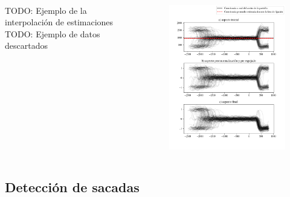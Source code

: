\documentclass[aspectratio=169]{beamer}
\begin{document}
\begin{frame}{~}

  \begin{columns}
    \begin{column}{0.5\textwidth}
      TODO: Ejemplo de la interpolación de estimaciones
      TODO: Ejemplo de datos descartados
    \end{column}
    \begin{column}{0.5\textwidth}
      \begin{figure}
        \centering
        \includegraphics[width=\linewidth]{img/normalization-looks-example.png}
      \end{figure}
    \end{column}
  \end{columns}

\end{frame}

\subsection{Detección de sacadas}
\end{document}
